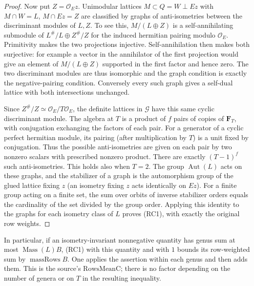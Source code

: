 \begin{proof}
Now put \(Z=\mathcal O_E z\). Unimodular lattices
\(M\subset Q=W\perp Ez\) with \(M\cap W=L\),
\(M\cap Ez=Z\) are classified by graphs of
anti-isometries between the discriminant modules of
\(L,Z\). To see this, \(M/(L\oplus Z)\) is a self-annihilating
submodule of \(L^\#/L\oplus Z^\#/Z\) for the induced
hermitian pairing modulo \(\mathcal O_E\). Primitivity
makes the two projections injective. Self-annihilation
then makes both surjective: for example a vector in the
annihilator of the first projection would give an element
of \(M/(L\oplus Z)\) supported in the first factor and
hence zero. The two discriminant modules are thus
isomorphic and the graph condition is exactly the
negative-pairing condition. Conversely every such graph
gives a self-dual lattice with both intersections unchanged.

Since \(Z^\#/Z\simeq \mathcal O_E/T\mathcal O_E\),
the definite lattices in \(\mathcal G\) have this
same cyclic discriminant module. The algebra at \(T\)
is a product of \(f\) pairs of copies of \(\mathbf F_T\),
with conjugation exchanging the factors of each pair.
For a generator of a cyclic perfect hermitian module,
its pairing (after multiplication by \(T\)) is a
unit fixed by conjugation. Thus the possible
anti-isometries are given on each pair by two nonzero
scalars with prescribed nonzero product. There are
exactly \((T-1)^f\) such anti-isometries. This holds also
when \(T=2\). The group \(\operatorname{Aut}(L)\)
acts on these graphs, and the stabilizer of a graph
is the automorphism group of the glued lattice fixing
\(z\) (an isometry fixing \(z\) acts identically on \(Ez\)).
For a finite group acting on a finite set, the sum over
orbits of inverse stabilizer orders equals the cardinality
of the set divided by the group order. Applying this
identity to the graphs for each isometry class of \(L\)
proves (RC1), with exactly the original row weights.
\end{proof}

In particular, if an isometry-invariant nonnegative
quantity has genus sum at most \(\operatorname{Mass}(L)B\),
(RC1) with this quantity and with \(1\) bounds its
row-weighted sum by \(\operatorname{massRows} B\).
One applies the assertion within each genus and then
adds them. This is the source's \(\mathrm{RowsMeanC}\);
there is no factor depending on the number of genera
or on \(T\) in the resulting inequality.

